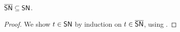 \begin{lemma}
  \label{lem:sat-preserves-sn}
  $\overline{\mathsf{SN}} \subseteq \mathsf{SN}$.
\end{lemma}
\begin{proof}
  We show $t \in \mathsf{SN}$ by induction on $t \in \overline{\mathsf{SN}}$, using .
\end{proof}





